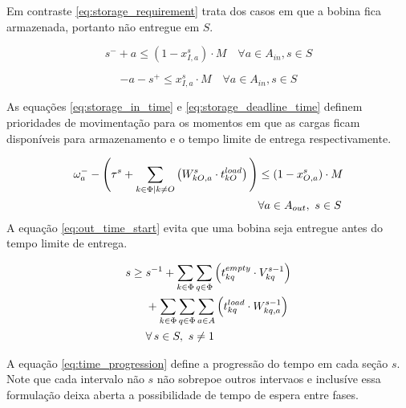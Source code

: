 \documentclass[journal]{IEEEtran}
\begin{document}
        Em contraste \ref{eq:storage_requirement} trata dos casos em que a bobina fica armazenada, portanto não
        entregue em $S$.
        
        

        \begin{equation}
        s^- + a \leq (1 - x^s_{I,a}) \cdot M \quad \forall a \in A_{in}, s \in S 
            \label{eq:storage_in_time}
        \end{equation}
        
        \begin{equation}
            -a - s^+ \leq x^s_{I,a} \cdot M \quad \forall a \in A_{in}, s \in S 
            \label{eq:storage_deadline_time}
        \end{equation}
        
        As equações \ref{eq:storage_in_time} e \ref{eq:storage_deadline_time} definem
        prioridades de movimentação para os momentos em que as cargas ficam disponíveis
        para armazenamento e o tempo limite de entrega respectivamente.

        \begin{align}
            \omega_a^- - \Bigg( \tau^s + 
            \sum_{k \in \Phi \mid k \neq O} \left( W^s_{kO,a} \cdot t^{load}_{kO} \right) 
            \Bigg) 
            &\leq (1 - x^s_{O,a}) \cdot M \notag \\
            &\forall a \in A_{out},\ s \in S 
            \label{eq:out_time_start}
        \end{align}
        A equação \ref{eq:out_time_start} evita que uma bobina seja entregue antes
        do tempo limite de entrega.

        \begin{align}
            s \geq\; & s^{-1} 
            + \sum_{k \in \Phi} \sum_{q \in \Phi} \left( t^{empty}_{kq} \cdot V^{s-1}_{kq} \right) \notag \\
            & + \sum_{k \in \Phi} \sum_{q \in \Phi} \sum_{a \in A} \left( t^{load}_{kq} \cdot W^{s-1}_{kq,a} \right) \notag \\
            & \forall\, s \in S,\ s \neq 1 \label{eq:time_progression}
        \end{align}

        A equação \ref{eq:time_progression} define a progressão do tempo em cada
         seção $s$.
        Note que cada intervalo não $s$ não sobrepoe outros intervaos e inclusíve
        essa formulação deixa aberta a possibilidade de tempo de espera entre fases.
        
\end{document}
